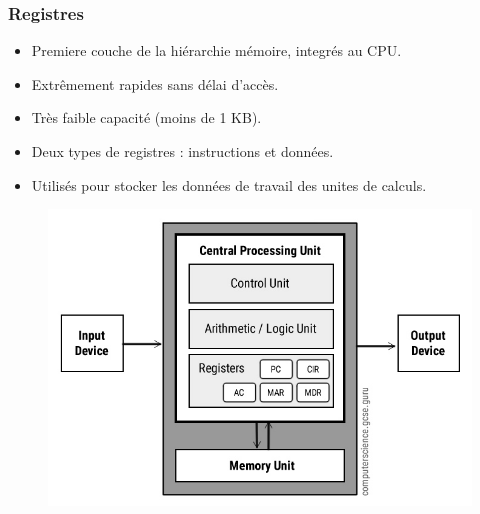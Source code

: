 \documentclass[10pt]{beamer}
\begin{document}
\begin{frame}
    \frametitle{Registres}
    \begin{itemize}
        \item Premiere couche de la hiérarchie mémoire, integr\'es au CPU.
        \item Extrêmement rapides sans délai d'accès.
        \item Très faible capacité (moins de 1 KB).
        \item Deux types de registres : instructions et données.
        \item Utilisés pour stocker les données de travail des unites de
              calculs.
    \end{itemize}
    \begin{figure}
        \centering

        \includegraphics[width=.45\textwidth]{figures/Von-Neumann-Architecture-Diagram.jpg}
        \label{fig:sub1}
    \end{figure}

\end{frame}
\end{document}
